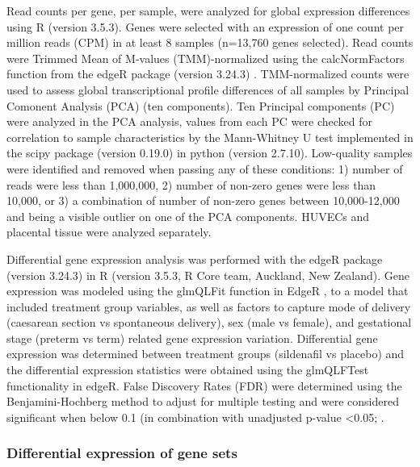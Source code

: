 \documentclass[authordate, empirical]{jote-new-article}
\begin{document}
	Read counts per gene, per sample, were analyzed for global expression differences using R (version 3.5.3). Genes were selected with an expression of one count per million reads (CPM) in at least 8 samples (n=13,760 genes selected). Read counts were Trimmed Mean of M-values (TMM)-normalized using the calcNormFactors function from the edgeR package (version 3.24.3) \parencites{Robinson2010}. TMM-normalized counts were used to assess global transcriptional profile differences of all samples by Principal Comonent Analysis (PCA) (ten components). Ten Principal components (PC) were analyzed in the PCA analysis, values from each PC were checked for correlation to sample characteristics by the Mann-Whitney U test implemented in the scipy package (version 0.19.0) in python (version 2.7.10). Low-quality samples were identified and removed when passing any of these conditions: 1) number of reads were less than 1,000,000, 2) number of non-zero genes were less than 10,000, or 3) a combination of number of non-zero genes between 10,000-12,000 and being a visible outlier on one of the PCA components. HUVECs and placental tissue were analyzed separately.



	Differential gene expression analysis was performed with the edgeR package (version 3.24.3) in R (version 3.5.3, R Core team, Auckland, New Zealand). Gene expression was modeled using the glmQLFit function in EdgeR \parencites{Robinson2010}, to a model that included treatment group variables, as well as factors to capture mode of delivery (caesarean section vs spontaneous delivery), sex (male vs female), and gestational stage (preterm vs term) related gene expression variation. Differential gene expression was determined between treatment groups (sildenafil vs placebo) and the differential expression statistics were obtained using the glmQLFTest functionality in edgeR. False Discovery Rates (FDR) were determined using the Benjamini-Hochberg method to adjust for multiple testing and were considered significant when below 0.1 (in combination with unadjusted p-value <0.05; \parencites{Benjamini1995}.







	\subsubsection{Differential expression of gene sets}
\end{document}
